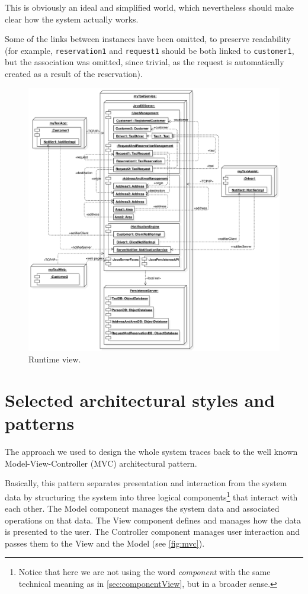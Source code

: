 This is obviously an ideal and simplified world, which nevertheless should make clear how the system actually works. 

Some of the links between instances have been omitted, to preserve readability (for example, \texttt{res\-er\-va\-tion1} and \texttt{re\-quest1} should be both linked to \texttt{cus\-tom\-er1}, but the association was omitted, since trivial, as the request is automatically created as a result of the reservation).

\begin{figure}%
	\centering%
	\includegraphics[width=\textwidth]{img/Runtime__RuntimeView_5}%
	\caption{Runtime view.}\label{fig:runtime}%
\end{figure}


\clearpage


\section{Selected architectural styles and patterns}\label{sec:styles}
The approach we used to design the whole system traces back to the well known Model-View-Controller (MVC) architectural pattern. 

Basically, this pattern separates presentation and interaction from the system data by structuring the system into three logical components\footnote{Notice that here we are not using the word \emph{component} with the same technical meaning as in \cref{sec:componentView}, but in a broader sense.} that interact with each other. The Model component manages the system data and associated operations on that data. The View component defines and manages how the data is presented to the user. The Controller component manages user interaction and passes them to the View and the Model (see \cref{fig:mvc}).

